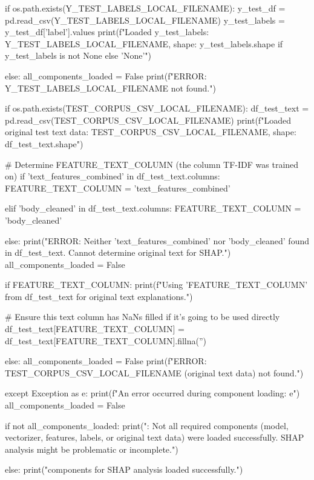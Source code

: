 \begin{ffcode}
        if os.path.exists(Y_TEST_LABELS_LOCAL_FILENAME):
            y_test_df = pd.read_csv(Y_TEST_LABELS_LOCAL_FILENAME)
            y_test_labels = y_test_df['label'].values
            print(f"Loaded y_test_labels: {Y_TEST_LABELS_LOCAL_FILENAME}, shape: {y_test_labels.shape if y_test_labels is not None else 'None'}")

        else:
        all_components_loaded = False
        print(f"ERROR: {Y_TEST_LABELS_LOCAL_FILENAME} not found.")

        if os.path.exists(TEST_CORPUS_CSV_LOCAL_FILENAME):
            df_test_text = pd.read_csv(TEST_CORPUS_CSV_LOCAL_FILENAME)
            print(f"Loaded original test text data: {TEST_CORPUS_CSV_LOCAL_FILENAME}, shape: {df_test_text.shape}")

            # Determine FEATURE_TEXT_COLUMN (the column TF-IDF was trained on)
            if 'text_features_combined' in df_test_text.columns:
                FEATURE_TEXT_COLUMN = 'text_features_combined'

            elif 'body_cleaned' in df_test_text.columns:
                FEATURE_TEXT_COLUMN = 'body_cleaned'

            else:
                print("ERROR: Neither 'text_features_combined' nor 'body_cleaned' found in df_test_text. Cannot determine original text for SHAP.")
                all_components_loaded = False

            if FEATURE_TEXT_COLUMN:
                print(f"Using '{FEATURE_TEXT_COLUMN}' from df_test_text for original text explanations.")

                # Ensure this text column has NaNs filled if it's going to be used directly
                df_test_text[FEATURE_TEXT_COLUMN] = df_test_text[FEATURE_TEXT_COLUMN].fillna('')

        else:
            all_components_loaded = False
            print(f"ERROR: {TEST_CORPUS_CSV_LOCAL_FILENAME} (original text data) not found.")

    except Exception as e:
        print(f"An error occurred during component loading: {e}")
        all_components_loaded = False

if not all_components_loaded:
    print("\nERROR: Not all required components (model, vectorizer, features, labels, or original text data) were loaded successfully. SHAP analysis might be problematic or incomplete.")

else:
    print("\nAll components for SHAP analysis loaded successfully.")


\end{ffcode}
